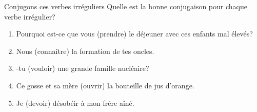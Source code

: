 \begin{frame}{Conjugons ces verbes irréguliers}
  Quelle est la bonne conjugaison pour chaque verbe irrégulier?
  \begin{enumerate}
    \item Pourquoi est-ce que vous \underline{} (prendre) le déjeuner avec ces enfants mal élevés?
    \item Nous \underline{} (connaître) la formation de tes oncles.
    \item \underline{}-tu (vouloir) une grande famille nucléaire?
    \item Ce gosse et sa mère \underline{} (ouvrir) la bouteille de jus d'orange.
    \item Je \underline{} (devoir) désobéir à mon frère aîné.
  \end{enumerate}
\end{frame}
